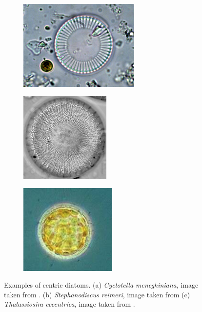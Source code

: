 \documentclass[letterpaper,12pt,oneside]{book}
\begin{document}
\begin{figure}[H]
     \centering
     \begin{subfigure}[b]{0.3\textwidth}
         \centering
         \includegraphics[width=\textwidth, height=4.5cm]{Imagesalgeacentric/Cyclotellameneghiniana.jpeg}
         \caption{  }
         \label{fig:y equals x}
     \end{subfigure}
     \hfill
     \begin{subfigure}[b]{0.3\textwidth}
         \centering
         \includegraphics[width=\textwidth, height=4.5cm]{Imagesalgeacentric/Stephanodiscus_L-4-58_6_1.jpeg}
         \caption{}
         \label{fig:three sin x}
     \end{subfigure}
     \hfill
     \begin{subfigure}[b]{0.3\textwidth}
         \centering
         \includegraphics[width=\textwidth, height=4.5cm]{Imagesalgeacentric/Screen Shot 2023-06-18 at 8.33.22 PM.png}
         \caption{}
         \label{fig:five over x}
     \end{subfigure}
        \caption{Examples of centric diatoms. 
(a) \textit{Cyclotella meneghiniana}, image taken from \cite{cyclotella}. (b) \textit{Stephanodiscus reimeri}, image taken from \cite{DiatomsofNorthAmerica} (c) \textit{Thalassiosira eccentrica}, image taken from \cite{Thalassiosiraimage}.}
        \label{centric diatoms}
\end{figure}
\end{document}
